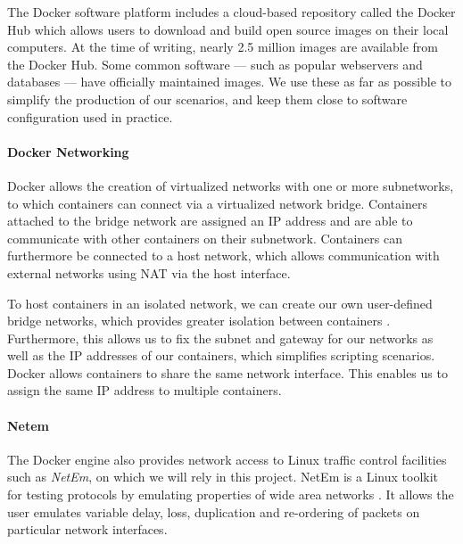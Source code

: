 The Docker software platform includes a cloud-based repository called the Docker Hub \cite{dockerhub} which allows users to download and build open source images on their local computers. At the time of writing, nearly 2.5 million images are available from the Docker Hub. Some common software --- such as popular webservers and databases --- have officially maintained images. We use these as far as possible to simplify the production of our scenarios, and keep them close to software configuration used in practice.


\paragraph*{Docker Networking} 
\label{sec:network}
Docker allows the creation of virtualized networks with one or more subnetworks, to which containers can connect via a virtualized network bridge. Containers attached to the bridge network are assigned an IP address and are able to communicate with other containers on their subnetwork. Containers can furthermore be connected to a host network, which allows communication with external networks using NAT via the host interface.

To host containers in an isolated network, we can create our own user-defined bridge networks, which provides greater isolation between containers \cite{docker_docs}. Furthermore, this allows us to fix the subnet and gateway for our networks as well as the IP addresses of our containers, which simplifies scripting scenarios. Docker allows containers to share the same network interface. This enables us to assign the same IP address to multiple containers.%

\paragraph*{Netem} 
The Docker engine also provides network access to Linux traffic control facilities such as \emph{NetEm}, on which we will rely in this project. NetEm is a Linux toolkit for testing protocols by emulating properties of wide area networks \cite{hemminger2005network}. It allows the user emulates variable delay, loss, duplication and re-ordering of packets on particular network interfaces.




